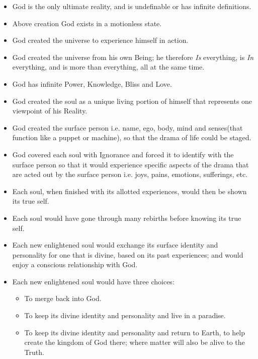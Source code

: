 \documentclass[12pt,a4paper]{book}
\begin{document}
\begin{itemize}
\renewcommand{\labelitemi}{$\diamond$}
\item God is the only ultimate reality, and is undefinable or has
  infinite definitions.

\item Above creation God exists in a motionless state.

\item God created the universe to experience himself in action.

\item God created the universe from his own Being; he therefore
  \emph{Is} everything, is \emph{In} everything, and is more than everything,
  all at the same time.

\item God has infinite Power, Knowledge, Bliss and Love.

\item God created the soul as a unique living portion of himself that
  represents one viewpoint of his Reality.

\item God created the surface person i.e. name, ego, body, mind and
  senses(that function like a puppet or machine), so that the drama of
  life could be staged.

\item God covered each soul with Ignorance and forced it to identify
  with the surface person so that it would experience specific aspects
  of the drama that are acted out by the surface person i.e. joys,
  pains, emotions, sufferings, etc.

\item Each soul, when finished with its allotted experiences, would
  then be shown its true self.

\item Each soul would have gone through many rebirths before knowing
  its true self.

\item Each new enlightened soul would exchange its surface identity
  and personality for one that is divine, based on its past
  experiences; and would enjoy a conscious relationship with God.

\item Each new enlightened soul would have three choices:

\begin{itemize}
\item To merge back into God.
\item To keep its divine identity and personality and live in a paradise.
\item To keep its divine identity and personality and return to Earth,
  to help create the kingdom of God there; where matter will also be
  alive to the Truth.
\end{itemize}
\end{itemize}
\end{document}
